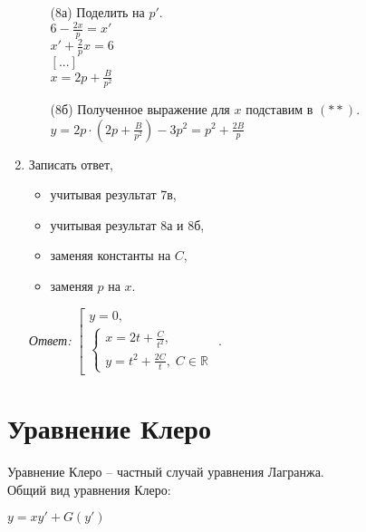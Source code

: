 \documentclass[10pt, a4paper]{article}
\begin{document}
\begin{enumerate}
        \begin{enumerate}
            \item[(8а)] Поделить на $p'$. \\
                  $6 - \frac{2x}{p} = x'$ \\
                  $x' + \frac{2}{p}x = 6$ \\
                  $[...]$ \\
                  $x = 2p + \frac{B}{p^2}$
            \item[(8б)] Полученное выражение для $x$ подставим в $(**)$. \\
                  $y = 2p  \cdot  (2p + \frac{B}{p^2}) - 3p^2 = p^2 + \frac{2B}{p}$
        \end{enumerate}
    \item Записать ответ,
        \begin{itemize}
            \item учитывая результат 7в,
            \item учитывая результат 8а и 8б,
            \item заменяя константы на $C$,
            \item заменяя $p$ на $x$.
        \end{itemize}
        \par\textit{Ответ:}
              $\left[
                  \begin{gathered}
                      y = 0, \\
                      \begin{cases}
                          x = 2t + \frac{C}{t^2}, \\
                          y = t^2 + \frac{2C}{t}, \; C \in \mathbb{R}
                      \end{cases}
                  \end{gathered}
              \right.$.
\end{enumerate}

\section{Уравнение Клеро}
Уравнение Клеро -- частный случай уравнения Лагранжа. \\
Общий вид уравнения Клеро:
\par $y = xy' + G(y')$
\end{document}
